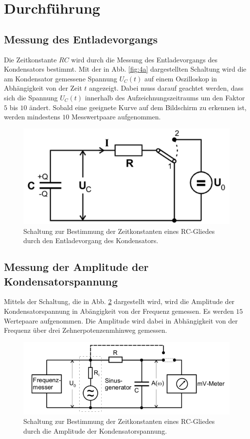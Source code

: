 \section{Durchführung}
\label{sec:Durchführung}

\subsection{Messung des Entladevorgangs}
Die Zeitkonstante $RC$ wird durch die Messung des Entladevorgangs des Kondensators bestimmt. 
Mit der in Abb. \ref{fig:4a} dargestellten Schaltung wird die am Kondensator gemessene Spannung $U_{C}(t)$ auf einem
Oszilloskop in Abhängigkeit von der Zeit $t$ angezeigt. Dabei muss darauf geachtet werden, dass sich die Spannung 
$U_{C}(t)$ innerhalb des Aufzeichnungszeitraums um den Faktor $5$ bis $10$ ändert. Sobald eine geeignete Kurve auf dem 
Bildschirm zu erkennen ist, werden mindestens $10$ Messwertpaare aufgenommen.
\begin{figure}
  \centering
  \includegraphics{build/4a.png}
  \caption{Schaltung zur Bestimmung der Zeitkonstanten eines RC-Gliedes durch den Entladevorgang des Kondensators.}
  \label{fig: 4a}
\end{figure}

\subsection{Messung der Amplitude der Kondensatorspannung}
Mittels der Schaltung, die in Abb. \ref{fig:4b} dargestellt wird, wird die Amplitude der Kondensatorspannung in 
Abängigkeit von der Frequenz gemessen. Es werden $15$ Wertepaare aufgenommen.
Die Amplitude wird dabei in Abhängigkeit von der Frequenz über drei Zehnerpotenzenmhinweg gemessen.
\begin{figure}
  \centering
  \includegraphics{build/4b.png}
  \caption{Schaltung zur Bestimmung der Zeitkonstanten eines RC-Gliedes durch die Amplitude der Kondensatorspannung.}
  \label{fig:4b}
\end{figure}


